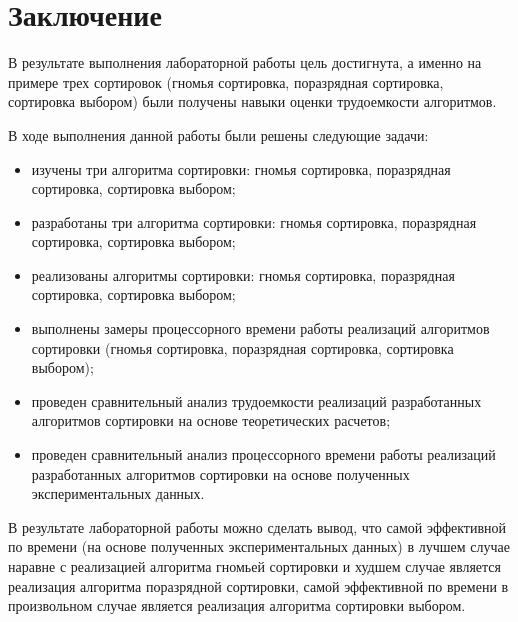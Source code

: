 \chapter*{Заключение}

В результате выполнения лабораторной работы цель достигнута, а именно 
на примере трех сортировок (гномья сортировка, поразрядная сортировка, сортировка выбором) были получены навыки оценки трудоемкости алгоритмов.

В ходе выполнения данной работы были решены следующие задачи:

\begin{itemize}
    \item изучены три алгоритма сортировки: гномья сортировка, поразрядная сортировка, сортировка выбором;
	\item разработаны три алгоритма сортировки: гномья сортировка, поразрядная сортировка, сортировка выбором;
	\item реализованы алгоритмы сортировки: гномья сортировка, поразрядная сортировка, сортировка выбором;
	\item выполнены замеры процессорного времени работы реализаций алгоритмов сортировки (гномья сортировка, поразрядная сортировка, сортировка выбором);
	\item проведен сравнительный анализ трудоемкости реализаций разработанных алгоритмов сортировки на основе теоретических расчетов;	
	\item проведен сравнительный анализ процессорного времени работы реализаций разработанных алгоритмов сортировки на основе полученных экспериментальных данных.
\end{itemize}

В результате лабораторной работы можно сделать вывод, что самой эффективной по времени (на основе полученных экспериментальных данных) в лучшем случае наравне с реализацией алгоритма гномьей сортировки и худшем случае является реализация алгоритма поразрядной сортировки, самой эффективной по времени в произвольном случае является реализация алгоритма сортировки выбором.


